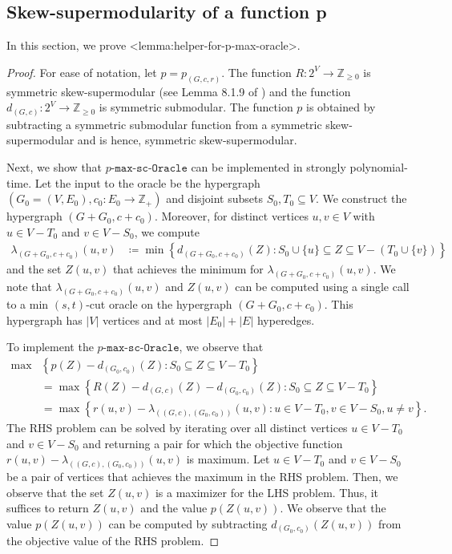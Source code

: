 \documentclass{article}
\def\Cref#1{<#1>}%
\def\({}
\def\){}
\newcommand{\functionMaximizationOracleStrongCover}[1]{\ensuremath{{#1}\text{-}\mathtt{max}\text{-}\mathtt{sc}\text{-}\mathtt{Oracle}}\xspace}
\providecommand{\Z}{\mathbb{Z}}
\begin{document}
\subsection{Skew-supermodularity of a function \(p\)}\label{sec:helper-for-p-max-oracle}
In this section, we prove \Cref{lemma:helper-for-p-max-oracle}. 
\lempmaxoracle*
\begin{proof}
    For ease of notation, let $p=p_{(G, c, r)}$. 
    The function $R:2^V\rightarrow \Z_{\ge 0}$ is symmetric skew-supermodular (see Lemma 8.1.9 of \cite{Frank-book}) and the function $d_{(G,c)}:2^V\rightarrow \Z_{\ge 0}$ is symmetric submodular. The function $p$ is obtained by subtracting a symmetric submodular function from a symmetric skew-supermodular and is hence, symmetric skew-supermodular. 

    Next, we show that \functionMaximizationOracleStrongCover{p} can be implemented in strongly polynomial-time. 
    Let the input to the oracle be the hypergraph $(G_0=(V, E_0), c_0: E_0\rightarrow \Z_+)$ and disjoint subsets $S_0, T_0\subseteq V$. 
    We construct the hypergraph $(G+G_0, c+c_0)$. Moreover, for distinct vertices $u, v\in V$ with $u\in V-T_0$ and $v\in V-S_0$, we compute  
    \begin{align*}
    \lambda_{(G+G_0, c+c_0)}(u, v)&\coloneqq \min\left\{d_{(G+G_0, c+c_0)}(Z): S_0\cup \{u\}\subseteq Z\subseteq V-(T_0\cup\{v\})\right\} 
    \end{align*}
    and the set $Z(u, v)$ that achieves the minimum for $\lambda_{(G+G_0, c+c_0)}(u, v)$. We note that $\lambda_{(G+G_0, c+c_0)}(u, v)$ and $Z(u,v)$ can be computed using a single call to a min $(s,t)$-cut oracle on the hypergraph $(G+G_0, c+c_0)$. This hypergraph has $|V|$ vertices and at most $|E_0|+|E|$ hyperedges.  

    To implement the \functionMaximizationOracleStrongCover{p}, we observe that 
    \begin{align*}
    \max&\left\{p(Z)-d_{(G_0, c_0)}(Z): S_0\subseteq Z\subseteq V-T_0\right\}\\
    &=\max\left\{R(Z)-d_{(G, c)}(Z)-d_{(G_0, c_0)}(Z): S_0\subseteq Z\subseteq V-T_0\right\}\\
    &=\max\left\{r(u, v)-\lambda_{((G, c), (G_0, c_0))}(u, v): u\in V-T_0, v\in V-S_0, u\neq v\right\}. 
    \end{align*}
    The RHS problem can be solved by iterating over all distinct vertices $u\in V-T_0$ and $v\in V-S_0$ and returning a pair for which the objective function $r(u, v)-\lambda_{((G, c), (G_0, c_0))}(u, v)$ is maximum. Let $u\in V-T_0$ and $v\in V-S_0$ be a pair of vertices that achieves the maximum in the RHS problem. Then, we observe that the set $Z(u, v)$ is a maximizer for the LHS problem. Thus, it suffices to return $Z(u, v)$ and the value $p(Z(u, v))$. We observe that the value $p(Z(u, v))$ can be computed by subtracting $d_{(G_0, c_0)}(Z(u,v))$ from the objective value of the RHS problem.


\end{proof}
\end{document}
